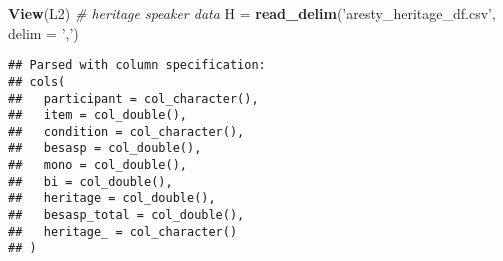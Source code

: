 \documentclass[
]{article}
\newenvironment{Shaded}{\begin{snugshade}}{\end{snugshade}}
\newcommand{\CommentTok}[1]{\textcolor[rgb]{0.56,0.35,0.01}{\textit{#1}}}
\newcommand{\DataTypeTok}[1]{\textcolor[rgb]{0.13,0.29,0.53}{#1}}
\newcommand{\KeywordTok}[1]{\textcolor[rgb]{0.13,0.29,0.53}{\textbf{#1}}}
\newcommand{\NormalTok}[1]{#1}
\newcommand{\StringTok}[1]{\textcolor[rgb]{0.31,0.60,0.02}{#1}}
\begin{document}
\begin{Shaded}
\begin{Highlighting}[]
\KeywordTok{View}\NormalTok{(L2)}
\CommentTok{# heritage speaker data}
\NormalTok{H =}\StringTok{ }\KeywordTok{read_delim}\NormalTok{(}\StringTok{'aresty_heritage_df.csv'}\NormalTok{, }\DataTypeTok{delim =} \StringTok{','}\NormalTok{)}
\end{Highlighting}
\end{Shaded}

\begin{verbatim}
## Parsed with column specification:
## cols(
##   participant = col_character(),
##   item = col_double(),
##   condition = col_character(),
##   besasp = col_double(),
##   mono = col_double(),
##   bi = col_double(),
##   heritage = col_double(),
##   besasp_total = col_double(),
##   heritage_ = col_character()
## )
\end{verbatim}
\end{document}
